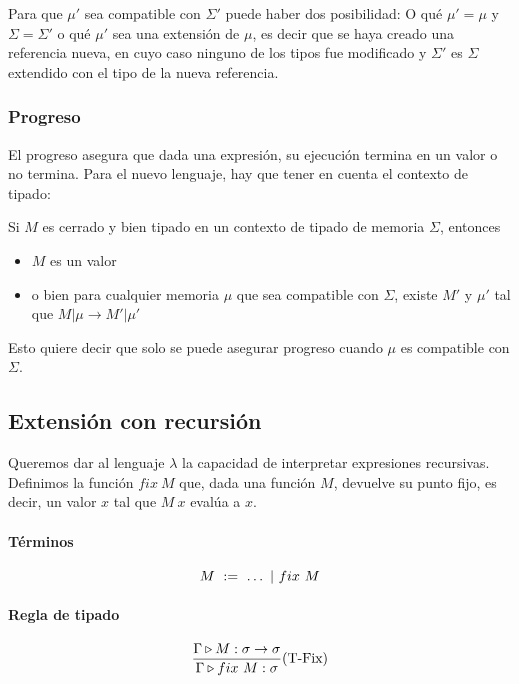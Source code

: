 Para que $\mu'$ sea compatible con $\Sigma'$ puede haber dos posibilidad: O qué $\mu' = \mu$ y $\Sigma = \Sigma'$ o qué $\mu'$ sea una extensión de $\mu$, es decir que se haya creado una referencia nueva, en cuyo caso ninguno de los tipos fue modificado y $\Sigma'$ es $\Sigma$ extendido con el tipo de la nueva referencia.

\subsubsection{Progreso} El progreso asegura que dada una expresión, su ejecución termina en un valor o no termina. Para el nuevo lenguaje, hay que tener en cuenta el contexto de tipado:

\begin{centrado}
	Si $M$ es cerrado y bien tipado en un contexto de tipado de memoria $\Sigma$, entonces
	\begin{itemize}
		\item $M$ es un valor
		\item o bien para cualquier memoria $\mu$ que sea compatible con $\Sigma$, existe $M'$ y $\mu'$ tal que $M|\mu\to M'|\mu'$
	\end{itemize}
\end{centrado}

Esto quiere decir que solo se puede asegurar progreso cuando $\mu$ es compatible con $\Sigma$.

\subsection{Extensión con recursión}\label{lambda_calculo:recursion}
Queremos dar al lenguaje $\lambda$ la capacidad de interpretar expresiones recursivas. 
Definimos la función $fix~M$ que, dada una función $M$, devuelve su punto fijo, es decir, un valor $x$ tal que $M~x$ evalúa a $x$.

\paragraph{Términos}
$$M~:=~\dots~|~fix~M$$

\paragraph{Regla de tipado}
\begin{equation*}
	\frac{\Gamma\triangleright M : \sigma\to\sigma}{\Gamma\triangleright fix~M : \sigma}(\text{T-Fix})
\end{equation*}


